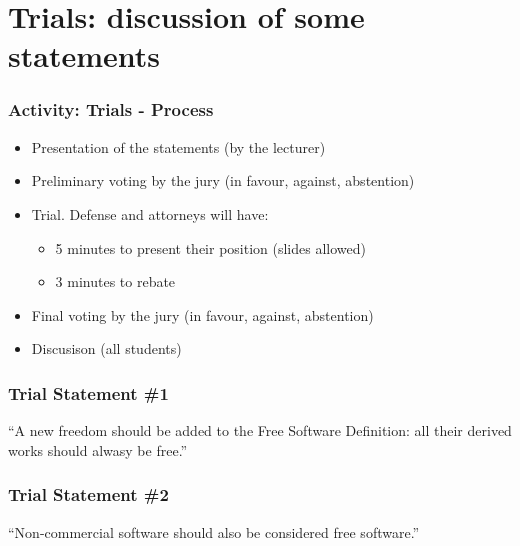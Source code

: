 

\section{Trials: discussion of some statements}


\begin{frame}
\frametitle{Activity: Trials - Process}

\begin{itemize}
\item Presentation of the statements (by the lecturer)
\item Preliminary voting by the jury (in favour, against, abstention)
\item Trial. Defense and attorneys will have:
\begin{itemize}
  \item 5 minutes to present their position (slides allowed)
  \item 3 minutes to rebate
\end{itemize}
\item Final voting by the jury (in favour, against, abstention)
\item Discusison (all students)
\end{itemize}

\end{frame}


\begin{frame}
\frametitle{Trial Statement \#1}

\begin{center}
\begin{LARGE}
``A new freedom should be added to the Free Software Definition:
all their derived works should alwasy be free.''
\end{LARGE}
\end{center}

\end{frame}



\begin{frame}
\frametitle{Trial Statement \#2}

\begin{center}
\begin{LARGE}
``Non-commercial software should also be considered free software.''
\end{LARGE}
\end{center}

\end{frame}



